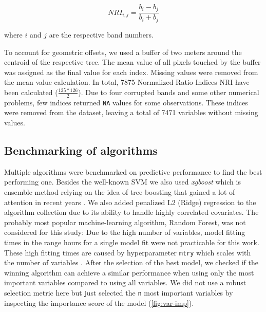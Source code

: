 \documentclass[review]{elsarticle}
\begin{document}
\begin{equation}
	NRI_{i,j} = \frac{b_{i} - b_{j}}{b_{i} + b_{j}}
\end{equation}

\noindent
where $i$ and $j$ are the respective band numbers.

To account for geometric offsets, we used a buffer of two meters around the centroid of the respective tree.
The mean value of all pixels touched by the buffer was assigned as the final value for each index.
Missing values were removed from the mean value calculation.
In total, 7875 Normalized Ratio Indices NRI have been calculated ($\frac{125*126}{2}$).
Due to four corrupted bands and some other numerical problems, few indices returned \texttt{NA} values for some observations.
These indices were removed from the dataset, leaving a total of 7471 variables without missing values.

\subsection{Benchmarking of algorithms}

Multiple algorithms were benchmarked on predictive performance to find the best performing one.
Besides the well-known \ac{SVM} \citep{Vapnik1998} we also used \textit{xgboost} which is ensemble method relying on the idea of tree boosting that gained a lot of attention in recent years \citep{chenXGBoostScalableTree2016}.
We also added penalized L2 (Ridge) regression to the algorithm collection due to its ability to handle highly correlated covariates.
The probably most popular machine-learning algorithm, Random Forest, was not considered for this study: Due to the high number of variables, model fitting times in the range hours for a single model fit were not practicable for this work.
These high fitting times are caused by hyperparameter \texttt{mtry} which scales with the number of variables \citep{Probst2018b}.
After the selection of the best model, we checked if the winning algorithm can achieve a similar performance when using only the most important variables compared to using all variables.
We did not use a robust selection metric here but just selected the \texttt{n} most important variables by inspecting the importance score of the model (\autoref{fig:var-imp}).

\end{document}
